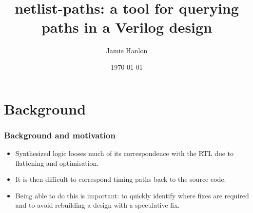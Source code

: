 \documentclass[professionalfonts]{beamer}
\begin{document}
\title{netlist-paths: a tool for querying paths in a Verilog design}
\author{Jamie Hanlon}
\date{\today}
\frame{\titlepage}

\section{Background}
\begin{frame}
\frametitle{Background and motivation}
  \begin{itemize}
  \item Synthesized logic looses much of its correspondence with the
    RTL due to flattening and optimisation.
  \item It is then difficult to correspond timing paths back to the source code.
  \item Being able to do this is important: to quickly identify where fixes are
    required and to avoid rebuilding a design with a speculative fix.
  \end{itemize}
\end{frame}
\end{document}
